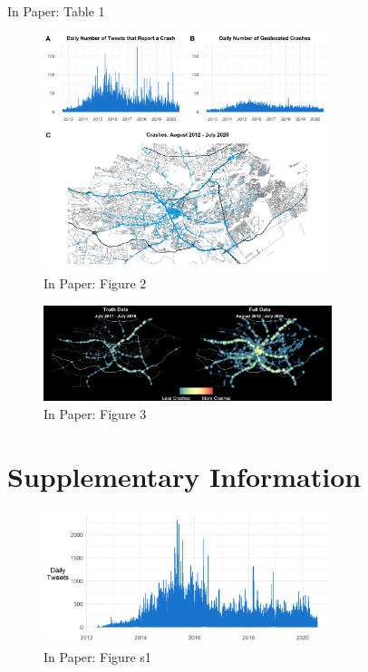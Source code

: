 \documentclass[9pt]{article}
\begin{document}
\begin{table}[H]
\caption{In Paper: Table 1}
\centering

\end{table}

\begin{figure}[H]
\centering
\includegraphics[width=0.75\textwidth]{figures/figure_2.png}
\caption{In Paper: Figure 2}
\end{figure}

\begin{figure}[H]
\centering
\includegraphics[width=0.75\textwidth]{figures/figure_3.png}
\caption{In Paper: Figure 3}
\end{figure}

\newpage
\section{Supplementary Information}

\begin{figure}[H]
\centering
\includegraphics[width=0.75\textwidth]{figures/figure_s1.png}
\caption{In Paper: Figure s1}
\end{figure}
\end{document}
